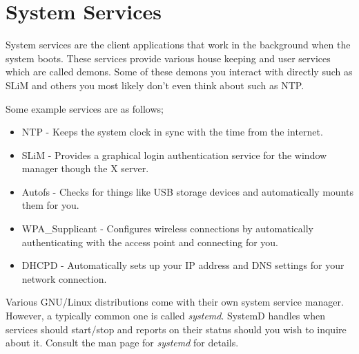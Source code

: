 
\section{System Services} %
\label{sec:systemservices}

System services are the client applications that work in the
background when the system boots. These services provide
various house keeping and user services which are called
demons. Some of these demons you interact with directly such
as SLiM and others you most likely don't even think about
such as NTP.

\begin{exmp}
	Some example services are as follows;
	\begin{itemize}
		\item NTP - Keeps the system clock in sync with the time
			from the internet.
		\item SLiM - Provides a graphical login authentication
			service for the window manager though the X server.
		\item Autofs - Checks for things like USB storage devices
			and automatically mounts them for you.
		\item WPA\_Supplicant - Configures wireless connections
			by automatically authenticating with the access point
			and connecting for you.
		\item DHCPD - Automatically sets up your IP address and
			DNS settings for your network connection.
	\end{itemize}
\end{exmp}

Various GNU/Linux distributions come with their own system
service manager. However, a typically common one is called
\emph{systemd}. SystemD handles when services should start/stop
and reports on their status should you wish to inquire about it.
Consult the man page for \emph{systemd} for details.
